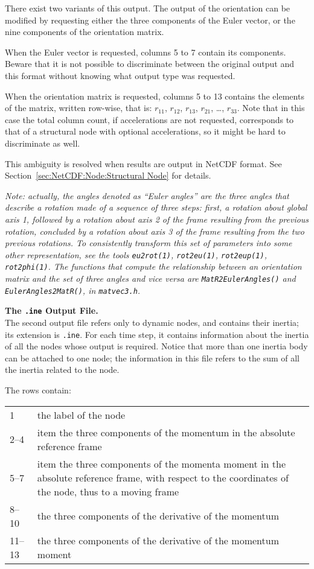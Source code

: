 There exist two variants of this output.
The output of the orientation can be modified by requesting
either the three components of the Euler vector,
or the nine components of the orientation matrix.

When the Euler vector is requested, columns 5 to 7 contain
its components.
Beware that it is not possible to discriminate between
the original output and this format without knowing
what output type was requested.

When the orientation matrix is requested, columns 5 to 13
contains the elements of the matrix, written row-wise,
that is: $r_{11}$, $r_{12}$, $r_{13}$, $r_{21}$, \ldots, $r_{33}$.
Note that in this case the total column count, if accelerations
are not requested, corresponds to that of a structural node
with optional accelerations, so it might be hard to discriminate
as well.

This ambiguity is resolved when results are output in NetCDF format.
See Section~\ref{sec:NetCDF:Node:Structural Node} for details.

\emph{Note: actually, the angles denoted as ``Euler angles'' 
are the three angles that describe a rotation made of a sequence
of three steps: first, a rotation about global axis 1,
followed by a rotation about axis 2 of the frame resulting from
the previous rotation, concluded by a rotation about axis 3
of the frame resulting from the two previous rotations.
To consistently transform this set of parameters into some other
representation, see the tools
\texttt{eu2rot(1)}, \texttt{rot2eu(1)}, \texttt{rot2eup(1)}, \texttt{rot2phi(1)}.
The functions that compute the relationship between an orientation
matrix and the set of three angles and vice versa are
\texttt{MatR2EulerAngles()} and \texttt{EulerAngles2MatR()}, in \texttt{matvec3.h}.
}

\textbf{The \texttt{.ine} Output File.} \\
The second output file refers only to dynamic nodes, and contains their
inertia; its extension is \texttt{.ine}.
For each time step, it contains information about the inertia of all the
nodes whose output is required.
Notice that more than one inertia body can be attached to one node; the
information in this file refers to the sum of all the inertia related to
the node.

The rows contain: \vspace{2mm} \\
\begin{tabular}{lp{140mm}}
        \hline
	1	& the label of the node \\
	2--4	& item the three components of the momentum
		in the absolute reference frame \\
	5--7	& item the three components of the momenta moment
		in the absolute reference frame,
		with respect to the coordinates of the node, 
		thus to a moving frame \\
    	8--10	& the three components of the derivative of the momentum \\
    	11--13	& the three components of the derivative of the momentum moment \\
	\hline
\end{tabular}\vspace{2mm}\\

